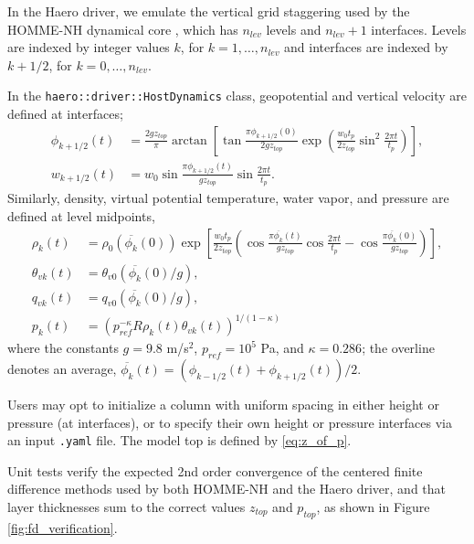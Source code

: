 In the Haero driver, we emulate the vertical grid staggering used by the HOMME-NH dynamical core \cite{Taylor2020}, which has $n_{lev}$ levels and $n_{lev}+1$ interfaces.
Levels are indexed by integer values $k$, for $k=1,\dotsc,n_{lev}$ and interfaces are indexed by $k+1/2$, for $k=0,\dotsc,n_{lev}$.

In the \texttt{haero::driver::HostDynamics} class, geopotential and vertical velocity are defined at interfaces;
\begin{align}
  \phi_{k+1/2}(t) &= \frac{2gz_{top}}{\pi}\arctan\left[\tan\frac{\pi \phi_{k+1/2}(0)}{2g z_{top}}\exp\left(\frac{w_0t_p}{2z_{top}} \sin^2 \frac{2\pi t}{t_p}\right)\right], \label{eq:phi_disc}\\
  w_{k+1/2}(t) &= w_0 \sin \frac{\pi \phi_{k+1/2}(t)}{g z_{top}}\sin\frac{2\pi t}{t_p}. \label{eq:w_disc}
\end{align}
Similarly, density, virtual potential temperature, water vapor, and pressure are defined at level midpoints,
\begin{align}
  \rho_k(t) &= \rho_0(\overline{\phi_k}(0))\exp\left[\frac{ w_0 t_p}{2z_{top}}\left(\cos\frac{\pi \overline{\phi_k}(t)}{gz_{top}}\cos\frac{2\pi t}{t_p}-\cos\frac{\pi \overline{\phi_{k}}(0)}{gz_{top}}\right)\right], \label{eq:rho_disc}\\
  \theta_{vk}(t) &= \theta_{v0}(\overline{\phi_k}(0)/g), \label{eq:thetav_disc} \\
  q_{vk}(t) &= q_{v0}(\overline{\phi_k}(0)/g), \label{eq:qv_disc} \\
p_k(t) &=  \left(p_{ref}^{-\kappa} R \rho_k(t)\theta_{vk}(t)\right)^{1/(1-\kappa)}\label{eq:p_disc}
\end{align}
where the constants $g = 9.8$ m/s$^2$, $p_{ref} = 10^5$ Pa, and $\kappa = 0.286$; the overline denotes an average, $\overline{\phi_k}(t) = (\phi_{k-1/2}(t) + \phi_{k+1/2}(t))/2$.

Users may opt to initialize a column with uniform spacing in either height or pressure (at interfaces), or to specify their own height or pressure interfaces via an input \texttt{.yaml} file.  
The model top is defined by \eqref{eq:z_of_p}.  

Unit tests verify the expected 2nd order convergence of the centered finite difference methods used by both HOMME-NH and the Haero driver, and that layer thicknesses sum to the correct values $z_{top}$ and $p_{top}$, as shown in Figure \ref{fig:fd_verification}.

